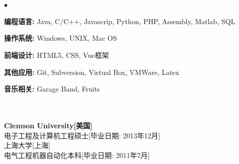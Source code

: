 \documentclass[UTF8]{ctexart}
\newcommand{\lineunder}{\vspace*{-8pt} \\
\hspace*{-18pt} \hrulefill \\}
\newcommand{\header}[1]{\large \vspace*{12pt}{\Large \hspace*{-15pt}\vspace*{6pt} \textsc{#1}} \vspace*{-6pt} \lineunder}
\newenvironment{achievements}{
\begin{list}
        {$\bullet$}{\topsep 0pt
        \itemsep 0pt}}{\vspace*{4pt}
\end{list}
}
\newcommand{\schools}[3]{\large \textbf{#1} #2\\

\vspace*{5pt} }
\begin{document}
\header{技能}
\begin{achievements}
    \item \textbf{编程语言:}               \hspace*{75pt}      Java, C/C++, Javascrip, Python, PHP, Assembly, Matlab, SQL
    \item \textbf{操作系统:}               \hspace*{75pt}       Windows, UNIX, Mac OS
    \item \textbf{前端设计:}        	     \hspace*{75pt}      HTML5, CSS, Vue框架
    \item \textbf{其他应用:}      	     \hspace*{75pt}       Git, Subversion, Virtual Box, VMWare, Latex
    \item \textbf{音乐相关:}             \hspace*{75pt}      Garage Band, Fruits

\end{achievements}

\header{教育背景}
\schools{Clemson University[美国]}
 {\\电子工程及计算机工程硕士[毕业日期: 2013年12月]}

\schools{上海大学[上海]}
 {\\电气工程机器自动化本科[毕业日期: 2011年7月]}

\end{document}
